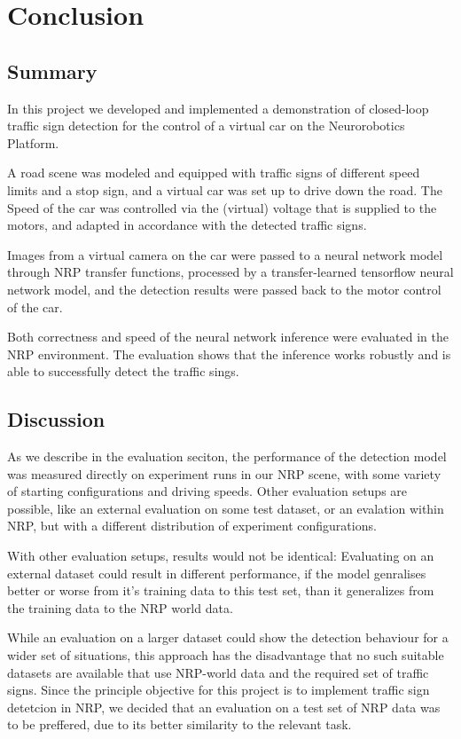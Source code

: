 
\section{Conclusion}

\subsection{Summary}

In this project we developed and implemented a demonstration of closed-loop traffic sign detection for the control of a virtual car on the Neurorobotics Platform. 

A road scene was modeled and equipped with traffic signs of different speed limits and a stop sign, and a virtual car was set up to drive down the road. The Speed of the car was controlled via the (virtual) voltage that is supplied to the motors, and adapted in accordance with the detected traffic signs.

Images from a virtual camera on the car were passed to a neural network model through NRP transfer functions, processed by a transfer-learned tensorflow neural network model, and the detection results were passed back to the motor control of the car.

Both correctness and speed of the neural network inference were evaluated in the NRP environment. The evaluation shows that the inference works robustly and is able to successfully detect the traffic sings.

\subsection{Discussion}
As we describe in the evaluation seciton, the performance of the detection model was measured directly on experiment runs in our NRP scene, with some variety of starting configurations and driving speeds. Other evaluation setups are possible, like an external evaluation on some test dataset, or an evalation within NRP, but with a different distribution of experiment configurations.

With other evaluation setups, results would not be identical: Evaluating on an external dataset could result in different performance, if the model genralises better or worse from it's training data to this test set, than it generalizes from the training data to the NRP world data.

While an evaluation on a larger dataset could show the detection behaviour for a wider set of situations, this approach has the disadvantage that no such suitable datasets are available that use NRP-world data and the required set of traffic signs. Since the principle objective for this project is to implement traffic sign detetcion in NRP, we decided that an evaluation on a test set of NRP data was to be preffered, due to its better similarity to the relevant task.

